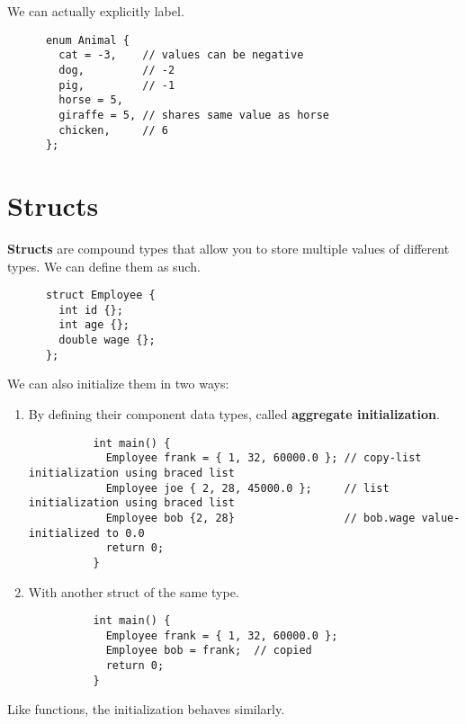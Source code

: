 \documentclass{article}
\begin{document}
  \begin{theorem}
    We can actually explicitly label. 
    \begin{lstlisting}
      enum Animal {
        cat = -3,    // values can be negative
        dog,         // -2
        pig,         // -1
        horse = 5,
        giraffe = 5, // shares same value as horse
        chicken,     // 6
      };
    \end{lstlisting}
  \end{theorem} 

\section{Structs} 

  \begin{definition}[Structs]
    \textbf{Structs} are compound types that allow you to store multiple values of different types. We can define them as such. 
    \begin{lstlisting}
      struct Employee {
        int id {};
        int age {};
        double wage {};
      };
    \end{lstlisting}
    We can also initialize them in two ways: 
    \begin{enumerate}
      \item By defining their component data types, called \textbf{aggregate initialization}. 
        \begin{lstlisting}
          int main() {
            Employee frank = { 1, 32, 60000.0 }; // copy-list initialization using braced list
            Employee joe { 2, 28, 45000.0 };     // list initialization using braced list
            Employee bob {2, 28}                 // bob.wage value-initialized to 0.0
            return 0;
          } 
        \end{lstlisting}

      \item With another struct of the same type. 
        \begin{lstlisting}
          int main() {
            Employee frank = { 1, 32, 60000.0 }; 
            Employee bob = frank;  // copied
            return 0;
          } 
        \end{lstlisting}
    \end{enumerate}
  \end{definition} 

  Like functions, the initialization behaves similarly. 
\end{document}

